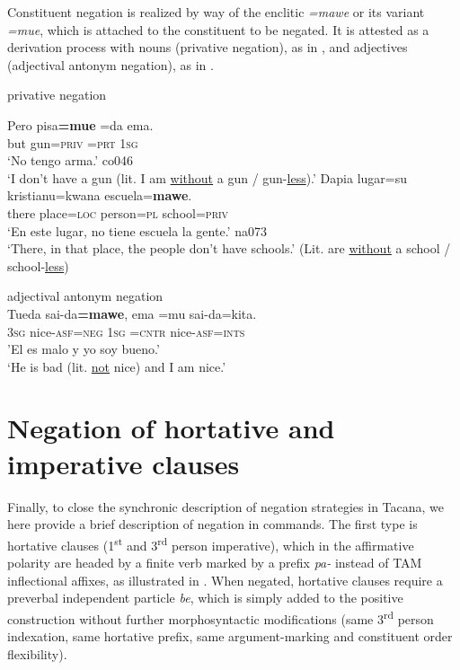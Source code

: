 \documentclass[output=paper,draft,draftmode,colorlinks,citecolor=brown]{langscibook}
\begin{document}
Constituent negation is realized by way of the enclitic
\textit{=mawe} or its variant \textit{=mue}, which is attached to the
constituent to be negated. It is attested as a derivation process with
nouns (privative negation), as in , and adjectives
(adjectival antonym negation), as in .

\begin{exe}\ex\label{ex:tacana-privative} privative negation
\begin{xlist}
\ex
\gll Pero pisa\textbf{=mue} =da ema.\\
    but gun=\textsc{priv} \textsc{=prt} \textsc{1sg}\\
\glt `No tengo arma.' co046\\
`I don't have a gun (lit. I am \uline{without} a gun \slash{}
gun-\uline{less}).'
\ex
\gll Dapia lugar=su kristianu=kwana escuela=\textbf{mawe}.\\
there place=\textsc{loc} person=\textsc{pl} school=\textsc{priv}\\
\glt `En este lugar, no tiene escuela la gente.' na073\\
`There, in that place, the people don't have schools.' (Lit. are
\uline{without} a school \slash{} school-\uline{less})
\end{xlist}
\ex\label{ex:tacana-antonym} adjectival antonym negation\\
\gll {}Tueda sai-da\textbf{=mawe}, ema =mu sai-da=kita.\\
3\textsc{sg} nice-\textsc{asf=neg} \textsc{1sg} \textsc{=cntr}
nice-\textsc{asf=ints}\\
\glt 'El es malo y yo soy bueno.' \citep[81]{Ottaviano1989} \\
`He is bad (lit. \uline{not} nice) and I am nice.'\\
\end{exe}

\section{Negation of hortative and imperative clauses}\label{sec:tacana-8}

Finally, to close the synchronic description of negation strategies in
Tacana, we here provide a brief description of negation in commands.
The first type is hortative clauses (1\textsuperscript{st} and
3\textsuperscript{rd} person imperative), which in the affirmative polarity
are headed by a finite verb marked by a prefix \textit{pa-} instead of TAM
inflectional affixes, as illustrated in .
When negated, hortative clauses require a preverbal independent
particle \textit{be}, which is simply added to the positive construction
without further morphosyntactic modifications (same 3\textsuperscript{rd}
person indexation, same hortative prefix, same argument-marking and constituent order flexibility).
\end{document}
